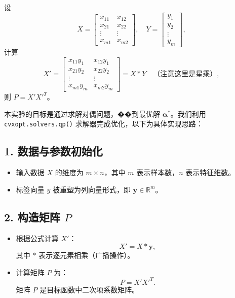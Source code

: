 \documentclass[12pt,a4paper,oneside]{article}
\begin{document}
设
\[
X = \begin{bmatrix}
x_{11} & x_{12} \\
x_{21} & x_{22} \\
\vdots & \vdots \\
x_{m1} & x_{m2}
\end{bmatrix}, \quad
Y = \begin{bmatrix}
y_1 \\
y_2 \\
\vdots \\
y_m
\end{bmatrix},
\]
计算
\[
X' = \begin{bmatrix}
x_{11} y_1 & x_{12} y_1 \\
x_{21} y_2 & x_{22} y_2 \\
\vdots & \vdots \\
x_{m1} y_m & x_{m2} y_m
\end{bmatrix} = X * Y \quad \text{（注意这里是星乘）},
\]
则 $P = X' {X'}^T$。


本实验的目标是通过求解对偶问题，��到最优解 $\bm{\alpha}^*$。我们利用 \texttt{cvxopt.solvers.qp()} 求解器完成优化，以下为具体实现思路：

\subsection*{1. 数据与参数初始化}
\begin{itemize}
    \item 输入数据 $X$ 的维度为 $m \times n$，其中 $m$ 表示样本数，$n$ 表示特征维数。
    \item 标签向量 $y$ 被重塑为列向量形式，即 $\bm{y} \in \mathbb{R}^m$。
\end{itemize}

\subsection*{2. 构造矩阵 $P$}
\begin{itemize}
    \item 根据公式计算 $X'$：  
    \[
    X' = X * \bm{y},
    \]
    其中 $*$ 表示逐元素相乘（广播操作）。
    \item 计算矩阵 $P$ 为：
    \[
    P = X' {X'}^T.
    \]
    矩阵 $P$ 是目标函数中二次项系数矩阵。
\end{itemize}
\end{document}
